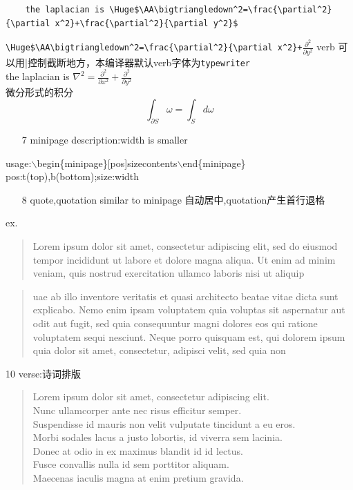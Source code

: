 \documentclass{article}[20pt]
\begin{document}
\begin{verbatim}
	the laplacian is \Huge$\AA\bigtriangledown^2=\frac{\partial^2}{\partial x^2}+\frac{\partial^2}{\partial y^2}$
\end{verbatim}
\verb|\Huge$\AA\bigtriangledown^2=\frac{\partial^2}{\partial x^2}+|$\frac{\partial^2}{\partial y^2}$
verb 可以用|控制截断地方，本编译器默认verb字体为{\tt typewriter}\\
the laplacian is {\Huge$\nabla^2=\frac{\partial^2}{\partial x^2}+\frac{\partial^2}{\partial y^2}$}\\
{\center 微分形式的积分} {$${\int}_{\partial S} \omega=\int_S d\omega$$}
\begin{itemize}\item [7] minipage description:width is smaller\end{itemize}\flushleft
usage:$\backslash$begin\{minipage\}[pos]{size}contents$\backslash$end\{minipage\}
\\pos:t(top),b(bottom);size:width
\begin{itemize}\item[8] quote,quotation similar to minipage 自动居中,quotation产生首行退格\end{itemize}\flushleft
ex.\begin{quote}
	Lorem ipsum dolor sit amet, consectetur adipiscing elit, sed do eiusmod tempor incididunt ut labore et dolore magna aliqua. Ut enim ad minim veniam, quis nostrud exercitation ullamco laboris nisi ut aliquip 
\end{quote}
\begin{quotation}
uae ab illo inventore veritatis et quasi architecto beatae vitae dicta sunt explicabo. Nemo enim ipsam voluptatem quia voluptas sit aspernatur aut odit aut fugit, sed quia consequuntur magni dolores eos qui ratione voluptatem sequi nesciunt. Neque porro quisquam est, qui dolorem ipsum quia dolor sit amet, consectetur, adipisci velit, sed quia non
\end{quotation}
10 verse:诗词排版
\begin{verse}\flushleft
Lorem ipsum dolor sit amet, consectetur adipiscing elit.\\
Nunc ullamcorper ante nec risus efficitur semper.\\
Suspendisse id mauris non velit vulputate tincidunt a eu eros.\\
Morbi sodales lacus a justo lobortis, id viverra sem lacinia.\\
Donec at odio in ex maximus blandit id id lectus.\\
Fusce convallis nulla id sem porttitor aliquam.\\
Maecenas iaculis magna at enim pretium gravida.\\
\end{verse}
\end{document}
